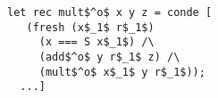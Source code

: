 \begin{figure}[h]
  \centering
  \begin{minipage}{0.87\columnwidth}
    \begin{lstlisting}[frame=tb]
 let rec mult$^o$ x y z = conde [
   (fresh (x$_1$ r$_1$)
     (x === S x$_1$) /\
     (add$^o$ y r$_1$ z) /\
     (mult$^o$ x$_1$ y r$_1$));
  ...]
    \end{lstlisting}
  \end{minipage}
\end{figure}
